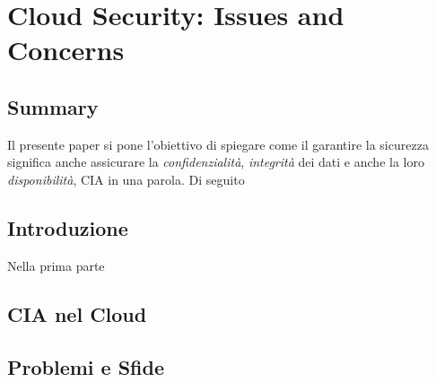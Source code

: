 \chapter{Cloud Security: Issues and Concerns}



\newpage


\section{Summary}
Il presente paper si pone l'obiettivo di spiegare come il garantire la sicurezza significa anche assicurare la \textit{confidenzialità}, \textit{integrità} dei dati e anche la loro \textit{disponibilità}, CIA in una parola.
Di seguito

\section{Introduzione}
Nella prima parte
\section{CIA nel Cloud}

\section{Problemi e Sfide}